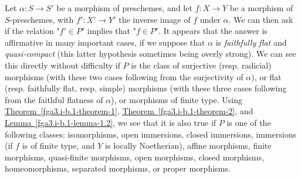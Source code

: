   Let \(\alpha \colon  S\to  S'\) be a morphism of preschemes, and let \(f\colon  X\to  Y\) be a morphism of \(S\)-preschemes, with \(f'\colon  X'\to  Y'\) the inverse image of \(f\) under \(\alpha \).
  We can then ask if the relation "\(f'\in  P\)" implies that "\(f\in  P\)".
  It appears that the answer is affirmative in many important cases, if we suppose that \(\alpha \) is \emph{faithfully flat} and \emph{quasi-compact} (this latter hypothesis sometimes being overly strong).
  We can see this directly without difficulty if \(P\) is the class of surjective (resp. radicial) morphisms (with these two cases following from the surjectivity of \(\alpha \)), or flat (resp. faithfully flat, resp. simple) morphisms (with these three cases following from the faithful flatness of \(\alpha \)), or morphisms of finite type.
  Using \hyperref[fga3.i-b.1-theorem-1]{Theorem~\ref*{fga3.i-b.1-theorem-1}}, \hyperref[fga3.i-b.1-theorem-2]{Theorem~\ref*{fga3.i-b.1-theorem-2}}, and \hyperref[fga3.i-b.1-lemma-1.2]{Lemma~\ref*{fga3.i-b.1-lemma-1.2}}, we see that it is also true if \(P\) is one of the following classes:
  isomorphisms, open immersions, closed immersions, immersions (if \(f\) is of finite type, and \(Y\) is locally Noetherian), affine morphisms, finite morphisms, quasi-finite morphisms, open morphisms, closed morphisms, homeomorphisms, separated morphisms, or proper morphisms.
  
